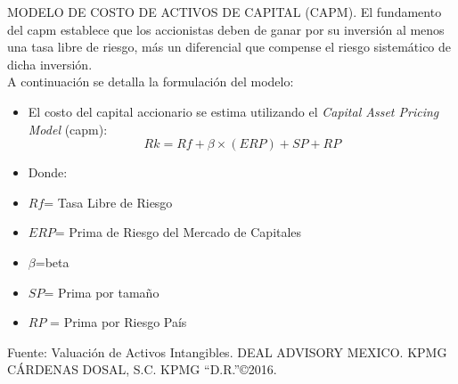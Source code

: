 \textcolor{secundario}{MODELO DE COSTO DE ACTIVOS DE CAPITAL (CAPM).} El fundamento del \gls{capm} establece que los accionistas deben de ganar por su inversi\'on al menos una tasa libre de riesgo, m\'as un diferencial que compense el riesgo sistem\'atico de dicha inversi\'on.\\[10pt]

A continuaci\'on se detalla la formulaci\'on del modelo:
\begin{center}
\begin{minipage}{8cm}
\begin{itemize}
\small
				\item El costo del capital accionario se estima utilizando el \textit{Capital Asset Pricing Model} (\gls{capm}):
				$$Rk=Rf+\beta\times(ERP)+SP+RP$$
				 \item Donde:
				 \item $Rf$= Tasa Libre de Riesgo
				 \item $ERP$= Prima de Riesgo del Mercado de Capitales
				 \item $\beta$=\gls{beta}
				 \item $SP$= Prima por tama\~no
				 \item $RP$ = Prima por Riesgo Pa\'is
			\end{itemize}
	\footnotesize{Fuente: Valuaci\'on de Activos Intangibles. DEAL ADVISORY MEXICO. KPMG C\'ARDENAS DOSAL, S.C. KPMG ``D.R.''\copyright 2016.}
		\end{minipage}
\end{center}

